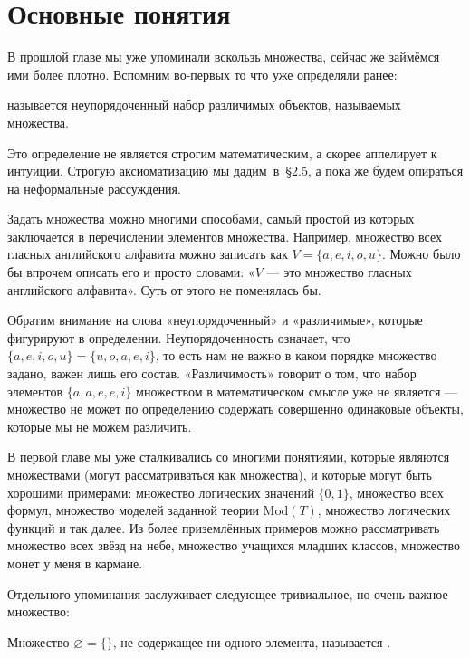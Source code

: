 \section{Основные понятия}

В прошлой главе мы уже упоминали вскользь множества, сейчас же займёмся ими более плотно. Вспомним во-первых то что уже определяли ранее:

\begin{definition}
 называется неупорядоченный набор различимых объектов, называемых  множества.
\end{definition}

Это определение не является строгим математическим, а скорее аппелирует к интуиции. Строгую аксиоматизацию мы дадим~в~\S2.5, а пока же будем опираться на неформальные рассуждения.

Задать множества можно многими способами, самый простой из которых заключается в перечислении элементов множества. Например, множество всех гласных английского алфавита можно записать как $V = \{a, e, i, o, u\}$. Можно было бы впрочем описать его и просто словами: «$V$ — это множество гласных английского алфавита». Суть от этого не поменялась бы.

Обратим внимание на слова «неупорядоченный» и «различимые», которые фигурируют в определении. Неупорядоченность означает, что $\{a, e, i, o, u\} = \{u, o, a, e, i\}$, то есть нам не важно в каком порядке множество задано, важен лишь его состав. «Различимость» говорит о том, что набор элементов $\{a, a, e, e, i\}$ множеством в математическом смысле уже не является — множество не может по определению содержать совершенно одинаковые объекты, которые мы не можем различить.

В первой главе мы уже сталкивались со многими понятиями, которые являются множествами (могут рассматриваться как множества), и которые могут быть хорошими примерами: множество логических значений $\{0, 1\}$, множество всех формул, множество моделей заданной теории $\mathrm{Mod}(T)$, множество логических функций и так далее. Из более приземлённых примеров можно рассматривать множество всех звёзд на небе, множество учащихся младших классов, множество монет у меня в кармане.

Отдельного упоминания заслуживает следующее тривиальное, но очень важное множество:

\begin{definition}
Множество $\varnothing=\{\}$, не содержащее ни одного элемента, называется .
\end{definition}

